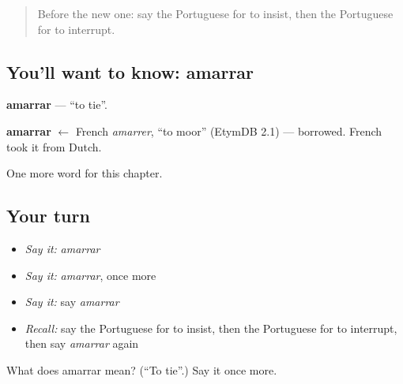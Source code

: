 \label{lesson:PT-C145-amarrar}



\begin{quote}
Before the new one: say the Portuguese for to insist, then the Portuguese for to interrupt.
\end{quote}

\subsection*{You'll want to know: amarrar}
\textbf{amarrar} — \textquotedblleft{}to tie\textquotedblright{}.

\begin{cousinweb}
\textbf{amarrar} $\leftarrow$ French \emph{amarrer}, \textquotedblleft{}to moor\textquotedblright{} (EtymDB 2.1) — borrowed. French took it from Dutch.
\end{cousinweb}

\begin{grammarlens}[title={What you've built}]
One more word for this chapter.
\end{grammarlens}

\subsection*{Your turn}
\begin{itemize}
\raggedright
  \item \emph{Say it:} \emph{amarrar}
  \item \emph{Say it:} \emph{amarrar}, once more
  \item \emph{Say it:} say \emph{amarrar}
  \item \emph{Recall:} say the Portuguese for to insist, then the Portuguese for to interrupt, then say \emph{amarrar} again
\end{itemize}

\begin{tcolorbox}[breakable,colback=teal!4,colframe=teal!35!black,title={Before you move on}]
What does amarrar mean? (\textquotedblleft{}To tie\textquotedblright{}.) Say it once more.
\end{tcolorbox}
